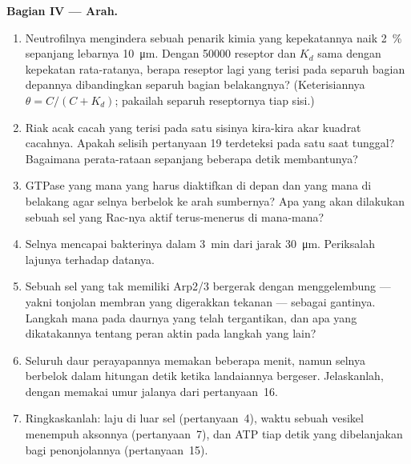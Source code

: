 \begin{problem}
\medskip
\noindent\textbf{Bagian IV --- Arah.}
\begin{enumerate}[resume]
  \item Neutrofilnya mengindera sebuah penarik kimia yang kepekatannya
        naik \qty{2}{\%} sepanjang lebarnya \qty{10}{\micro m}. Dengan
        \num{50000} reseptor dan $K_{d}$ sama dengan kepekatan
        rata-ratanya, berapa reseptor lagi yang terisi pada separuh bagian
        depannya dibandingkan separuh bagian belakangnya? (Keterisiannya
        $\theta = C/(C +
        K_{d})$; pakailah separuh reseptornya tiap sisi.)
  \item Riak acak cacah yang terisi pada satu sisinya kira-kira akar
        kuadrat cacahnya. Apakah selisih pertanyaan 19 terdeteksi pada satu
        saat tunggal? Bagaimana perata-rataan sepanjang beberapa detik
        membantunya?
  \item GTPase yang mana yang harus diaktifkan di depan dan yang mana di
        belakang agar selnya berbelok ke arah sumbernya? Apa yang akan
        dilakukan sebuah sel yang Rac-nya aktif terus-menerus di mana-mana?
  \item Selnya mencapai bakterinya dalam \qty{3}{min} dari jarak
        \qty{30}{\micro m}. Periksalah lajunya terhadap datanya.
  \item Sebuah sel yang tak memiliki Arp2/3 bergerak dengan menggelembung ---
        yakni tonjolan membran yang digerakkan tekanan --- sebagai gantinya.
        Langkah mana pada daurnya yang telah tergantikan, dan apa yang
        dikatakannya tentang peran aktin pada langkah yang lain?
  \item Seluruh daur perayapannya memakan beberapa menit, namun selnya
        berbelok dalam hitungan detik ketika landaiannya bergeser.
        Jelaskanlah, dengan memakai umur jalanya dari pertanyaan~16.
  \item Ringkaskanlah: laju  di luar sel (pertanyaan~4),
        waktu sebuah vesikel menempuh aksonnya (pertanyaan~7), dan ATP
        tiap detik yang dibelanjakan bagi penonjolannya (pertanyaan~15).
\end{enumerate}
\end{problem}
